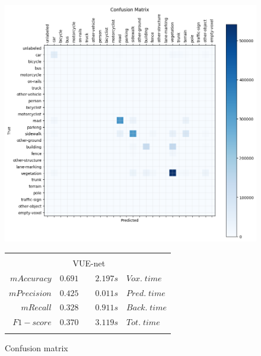 \begin{figure}[ht]
    \centering
    \begin{minipage}{0.45\textwidth}
        \centering
        \includegraphics[width=\textwidth]{images/confusion_matrix.png}
        \caption{Confusion matrix}
        \label{fig:matrix}
    \end{minipage}\hfill
    \begin{minipage}{0.45\textwidth}
        \centering
        \begin{tabular}{r|c|c|c|l}
            \multicolumn{5}{c}{\rule[-0.4cm]{0pt}{1.2cm}}  \\
            \multicolumn{1}{c}{} & \multicolumn{3}{c}{\rule[-0.4cm]{0pt}{1cm} VUE-net} & \multicolumn{1}{c}{} \\ \cline{2-2} \cline{4-4}
            $mAccuracy$  & \rule[-0.4cm]{0pt}{1cm} $0.691$ & & $2.197s$ & $Vox.\;time$   \\ \cline{2-2} \cline{4-4}
            $mPrecision$ & \rule[-0.4cm]{0pt}{1cm} $0.425$ & & $0.011s$ & $Pred.\;time$  \\ \cline{2-2} \cline{4-4}
            $mRecall$    & \rule[-0.4cm]{0pt}{1cm} $0.328$ & & $0.911s$ & $Back.\;time$  \\ \cline{2-2} \cline{4-4}
            $F1-score$   & \rule[-0.4cm]{0pt}{1cm} $0.370$ & & $3.119s$ & $Tot.\;time$ \\ \cline{2-2} \cline{4-4}
            \multicolumn{5}{c}{\rule[-0.4cm]{0pt}{1.2cm}}  \\
        \end{tabular}
        \label{tab:metrics}
    \end{minipage}
\end{figure}

